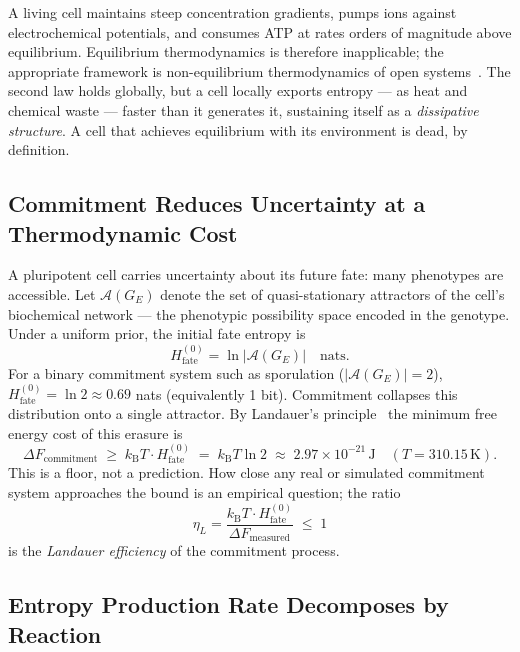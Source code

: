\documentclass[11pt,a4paper]{article}
\newcommand{\kB}{k_{\mathrm{B}}}
\newcommand{\Ge}{G_E}
\newcommand{\DeltaF}{\Delta F}
\newcommand{\Aset}{\mathcal{A}}
\newcommand{\Hfate}{H_{\mathrm{fate}}}
\begin{document}
A living cell maintains steep concentration gradients, pumps ions against
electrochemical potentials, and consumes ATP at rates orders of magnitude
above equilibrium.  Equilibrium thermodynamics is therefore inapplicable;
the appropriate framework is non-equilibrium thermodynamics of open
systems~\cite{Nicolis1977}.  The second law holds globally,
but a cell locally exports entropy --- as heat and chemical waste --- faster
than it generates it, sustaining itself as a \emph{dissipative structure}.
A cell that achieves equilibrium with its environment is dead, by
definition.

\subsection{Commitment Reduces Uncertainty at a Thermodynamic Cost}

A pluripotent cell carries uncertainty about its future fate: many
phenotypes are accessible.  Let \(\Aset(\Ge)\) denote the set of
quasi-stationary attractors of the cell's biochemical network --- the
phenotypic possibility space encoded in the genotype.  Under a uniform
prior, the initial fate entropy is
\begin{equation}
  \Hfate^{(0)} = \ln|\Aset(\Ge)| \quad\text{nats}.
  \label{eq:fate-entropy}
\end{equation}
For a binary commitment system such as sporulation
(\(|\Aset(\Ge)| = 2\)), \(\Hfate^{(0)} = \ln 2 \approx 0.69\) nats
(equivalently 1 bit).  Commitment collapses
this distribution onto a single attractor.  By Landauer's
principle~\cite{Landauer1961} the minimum free energy cost of this
erasure is
\begin{equation}
  \DeltaF_{\mathrm{commitment}} \;\geq\; \kB T \cdot \Hfate^{(0)}
  \;=\; \kB T \ln 2 \;\approx\; 2.97\times10^{-21}\,\mathrm{J}
  \quad(T = 310.15\,\mathrm{K}).
  \label{eq:landauer-binary}
\end{equation}
This is a floor, not a prediction.  How close any real or simulated
commitment system approaches the bound is an empirical question; the
ratio
\begin{equation}
  \eta_L = \frac{\kB T \cdot \Hfate^{(0)}}{\DeltaF_{\mathrm{measured}}}
  \;\leq\; 1
  \label{eq:eta-L}
\end{equation}
is the \emph{Landauer efficiency} of the commitment process.

\subsection{Entropy Production Rate Decomposes by Reaction}
\end{document}
